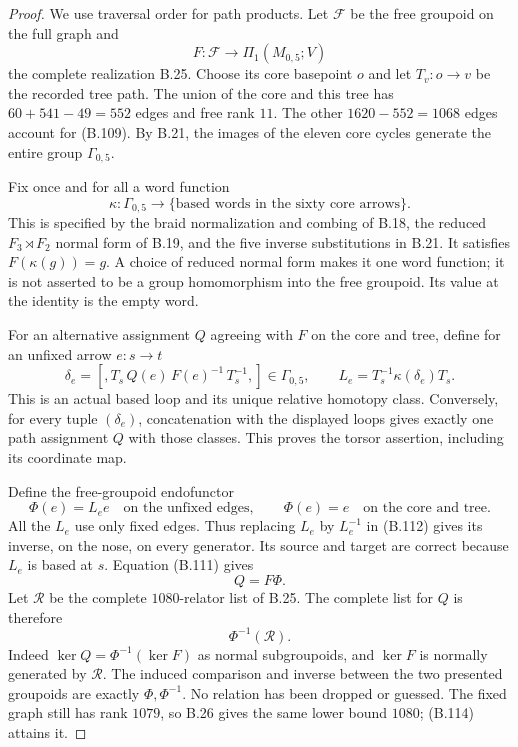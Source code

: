 \begin{proof}
We use traversal order for path products.  Let $\mathcal F$
be the free groupoid on the full graph and
\[
 F:\mathcal F\longrightarrow\Pi_1(M_{0,5};V)
\]
the complete realization B.25.  Choose its core basepoint
$o$ and let $T_v:o\to v$ be the recorded tree path.
The union of the core and this tree has
$60+541-49=552$ edges and free rank $11$.
The other $1620-552=1068$ edges account for (B.109).
By B.21, the images of the eleven core cycles generate the
entire group $\Gamma_{0,5}$.

Fix once and for all a word function
\[
 \kappa:\Gamma_{0,5}\longrightarrow
       \{\text{based words in the sixty core arrows}\}.         \tag{B.110}
\]
This is specified by the braid normalization and combing
of B.18, the reduced $F_3\rtimes F_2$ normal form of B.19,
and the five inverse substitutions in B.21.  It satisfies
$F(\kappa(g))=g$.  A choice of reduced normal form makes it
one word function; it is not asserted to be a group
homomorphism into the free groupoid.  Its value at the
identity is the empty word.

For an alternative assignment $Q$ agreeing with $F$ on
the core and tree, define for an unfixed arrow $e:s\to t$
\[
 \delta_e=[,T_s\,Q(e)\,F(e)^{-1}\,T_s^{-1},]
           \in\Gamma_{0,5},\qquad
 L_e=T_s^{-1}\kappa(\delta_e)T_s.                              \tag{B.111}
\]
This is an actual based loop and its unique relative
homotopy class.  Conversely, for every tuple $(\delta_e)$,
concatenation with the displayed loops gives exactly one
path assignment $Q$ with those classes.  This proves the
torsor assertion, including its coordinate map.

Define the free-groupoid endofunctor
\[
 \Phi(e)=L_e e\quad\text{on the unfixed edges},\qquad
 \Phi(e)=e\quad\text{on the core and tree}.                     \tag{B.112}
\]
All the $L_e$ use only fixed edges.  Thus replacing $L_e$
by $L_e^{-1}$ in (B.112) gives its inverse, on the nose,
on every generator.  Its source and target are correct
because $L_e$ is based at $s$.  Equation (B.111) gives
\[
                         Q=F\Phi.                             \tag{B.113}
\]
Let $\mathcal R$ be the complete $1080$-relator list of
B.25.  The complete list for $Q$ is therefore
\[
                         \Phi^{-1}(\mathcal R).                \tag{B.114}
\]
Indeed $\ker Q=\Phi^{-1}(\ker F)$ as normal subgroupoids,
and $\ker F$ is normally generated by $\mathcal R$.
The induced comparison and inverse between the two
presented groupoids are exactly $\Phi,\Phi^{-1}$.
No relation has been dropped or guessed.  The fixed graph
still has rank $1079$, so B.26 gives the same lower bound
$1080$; (B.114) attains it.


\end{proof}
